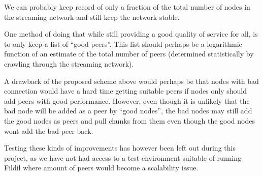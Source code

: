 \documentclass[10pt, a4paper]{article}
\begin{document}
We can probably keep record of only a fraction of the total number of
nodes in the streaming network and still keep the network stable.

One method of doing that while still providing a good quality of
service for all, is to only keep a list of ``good peers''. This list
should perhaps be a logarithmic function of an estimate of the total
number of peers (determined statistically by crawling through the
streaming network).

A drawback of the proposed scheme above would perhaps be that nodes
with bad connection would have a hard time getting suitable peers if
nodes only should add peers with good performance. However, even
though it is unlikely that the bad node will be added as a peer by
``good nodes'', the bad nodes may still add the good nodes as peers
and pull chunks from them even though the good nodes wont add the bad
peer back.

Testing these kinds of improvements has however been left out during
this project, as we have not had access to a test environment suitable
of running Fildil where amount of peers would become a scalability
issue.

\newpage


\end{document}

